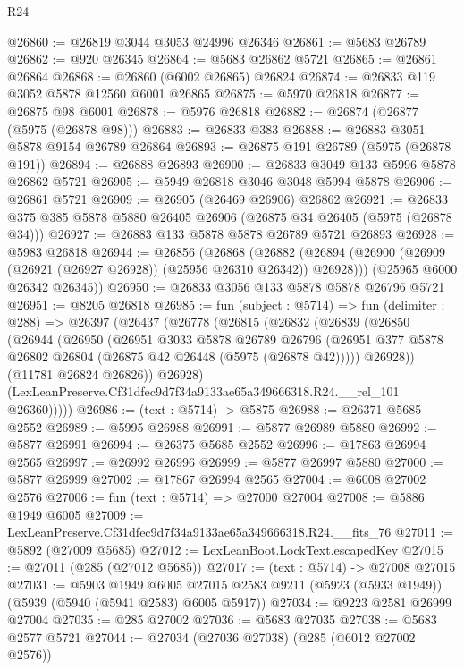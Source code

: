 \begin{lexlean}{R24}
\begin{coremodule}
@26860 := @26819 @3044 @3053 @24996 @26346
@26861 := @5683 @26789
@26862 := @920 @26345
@26864 := @5683 @26862 @5721
@26865 := @26861 @26864
@26868 := @26860 (@6002 @26865) @26824
@26874 := @26833 @119 @3052 @5878 @12560 @6001 @26865
@26875 := @5970 @26818
@26877 := @26875 @98 @6001
@26878 := @5976 @26818
@26882 := @26874 (@26877 (@5975 (@26878 @98)))
@26883 := @26833 @383
@26888 := @26883 @3051 @5878 @9154 @26789 @26864
@26893 := @26875 @191 @26789 (@5975 (@26878 @191))
@26894 := @26888 @26893
@26900 := @26833 @3049 @133 @5996 @5878 @26862 @5721
@26905 := @5949 @26818 @3046 @3048 @5994 @5878
@26906 := @26861 @5721
@26909 := @26905 (@26469 @26906) @26862
@26921 := @26833 @375 @385 @5878 @5880 @26405 @26906 (@26875 @34 @26405 (@5975 (@26878 @34)))
@26927 := @26883 @133 @5878 @5878 @26789 @5721 @26893
@26928 := @5983 @26818
@26944 := @26856
    (@26868
      (@26882 (@26894 (@26900 (@26909 (@26921 (@26927 @26928)) (@25956 @26310 @26342)) @26928)))
      (@25965 @6000 @26342 @26345))
@26950 := @26833 @3056 @133 @5878 @5878 @26796 @5721
@26951 := @8205 @26818
@26985 := fun (subject : @5714) =>
  fun (delimiter : @288) =>
  @26397
    (@26437
      (@26778
        (@26815
          (@26832
            (@26839
              (@26850
                (@26944
                  (@26950
                    (@26951
                      @3033
                      @5878
                      @26789
                      @26796
                      (@26951 @377 @5878 @26802 @26804 (@26875 @42 @26448 (@5975 (@26878 @42)))))
                    @26928))
                (@11781 @26824 @26826))
              @26928)
            (LexLeanPreserve.Cf31dfec9d7f34a9133ae65a349666318.R24.__rel_101 @26360)))))
@26986 := (text : @5714) -> @5875
@26988 := @26371 @5685 @2552
@26989 := @5995 @26988
@26991 := @5877 @26989 @5880
@26992 := @5877 @26991
@26994 := @26375 @5685 @2552
@26996 := @17863 @26994 @2565
@26997 := @26992 @26996
@26999 := @5877 @26997 @5880
@27000 := @5877 @26999
@27002 := @17867 @26994 @2565
@27004 := @6008 @27002 @2576
@27006 := fun (text : @5714) => @27000 @27004
@27008 := @5886 @1949 @6005
@27009 := LexLeanPreserve.Cf31dfec9d7f34a9133ae65a349666318.R24.__fits_76
@27011 := @5892 (@27009 @5685)
@27012 := LexLeanBoot.LockText.escapedKey
@27015 := @27011 (@285 (@27012 @5685))
@27017 := (text : @5714) -> @27008 @27015
@27031 := @5903
    @1949
    @6005
    @27015
    @2583
    @9211
    (@5923 (@5933 @1949))
    (@5939 (@5940 (@5941 @2583) @6005 @5917))
@27034 := @9223 @2581 @26999 @27004
@27035 := @285 @27002
@27036 := @5683 @27035
@27038 := @5683 @2577 @5721
@27044 := @27034 (@27036 @27038) (@285 (@6012 @27002 @2576))

\end{coremodule}
\end{lexlean}
